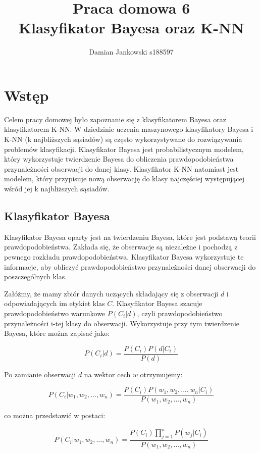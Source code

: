 \documentclass{article}
\title{Praca domowa 6\\Klasyfikator Bayesa oraz K-NN}
\author{Damian Jankowski s188597}
\begin{document}
\maketitle

\section{Wstęp}

Celem pracy domowej było zapoznanie się z klasyfikatorem Bayesa oraz
klasyfikatorem K-NN. W dziedzinie uczenia maszynowego klasyfikatory 
Bayesa i K-NN (k najbliższych sąsiadów) są 
często wykorzystywane do rozwiązywania problemów klasyfikacji. 
Klasyfikator Bayesa jest probabilistycznym modelem, 
który wykorzystuje twierdzenie Bayesa do obliczenia 
prawdopodobieństwa przynależności obserwacji do danej klasy. 
Klasyfikator K-NN natomiast jest modelem, 
który przypisuje nową obserwację do klasy najczęściej 
występującej wśród jej k najbliższych sąsiadów.

\subsection{Klasyfikator Bayesa}
Klasyfikator Bayesa oparty jest na twierdzeniu Bayesa, 
które jest podstawą teorii prawdopodobieństwa. Zakłada 
się, że obserwacje są niezależne i pochodzą z pewnego 
rozkładu prawdopodobieństwa. Klasyfikator Bayesa 
wykorzystuje te informacje, aby obliczyć prawdopodobieństwo 
przynależności danej obserwacji do poszczególnych klas.

Załóżmy, że mamy zbiór danych uczących składający się z 
obserwacji $d$ i odpowiadających im etykiet klas $C$. 
Klasyfikator Bayesa szacuje prawdopodobieństwo warunkowe 
$P(C_i|d)$, czyli prawdopodobieństwo przynależności i-tej
klasy do obserwacji. Wykorzystuje przy tym 
twierdzenie Bayesa, które można zapisać jako:

\begin{equation}
    P(C_i|d) = \frac{P(C_i)P(d|C_i)}{P(d)}
\end{equation}

Po zamianie obserwacji $d$ na wektor cech $w$ otrzymujemy:

\begin{equation}
    P(C_i|w_1, w_2, ..., w_n) = \frac{P(C_i)P(w_1, w_2, ..., w_n|C_i)}{P(w_1, w_2, ..., w_n)}
\end{equation}

co można przedstawić w postaci:

\begin{equation}
    P(C_i|w_1, w_2, ..., w_n) = \frac{P(C_i)\prod_{j=1}^{n}P(w_j|C_i)}{P(w_1, w_2, ..., w_n)}
\end{equation}
\end{document}
